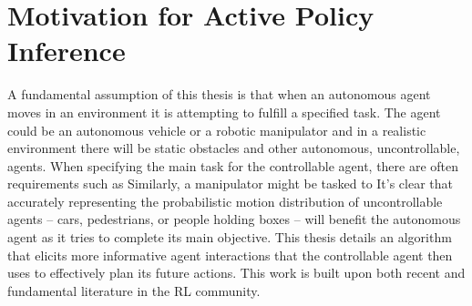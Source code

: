 %
%
\chapter{Motivation for Active Policy Inference}\label{chapt:motivation}

%
%
%
%

    A fundamental assumption of this thesis is that when an autonomous agent moves in an environment it is attempting to
    fulfill a specified task. The agent could be an autonomous vehicle or a robotic manipulator and in a realistic
    environment there will be static obstacles and other autonomous, uncontrollable, agents. When specifying the main
    task for the controllable agent, there are often requirements such as  Similarly, a manipulator might be tasked
    to  It's clear that
    accurately representing the probabilistic motion distribution of uncontrollable agents -- cars, pedestrians, or
    people holding boxes -- will benefit the autonomous agent as it tries to complete its main objective. This thesis
    details an algorithm that elicits more informative agent interactions that the controllable agent then uses to
    effectively plan its future actions. This work is built upon both recent and fundamental literature in the \ac{RL}
    community.

